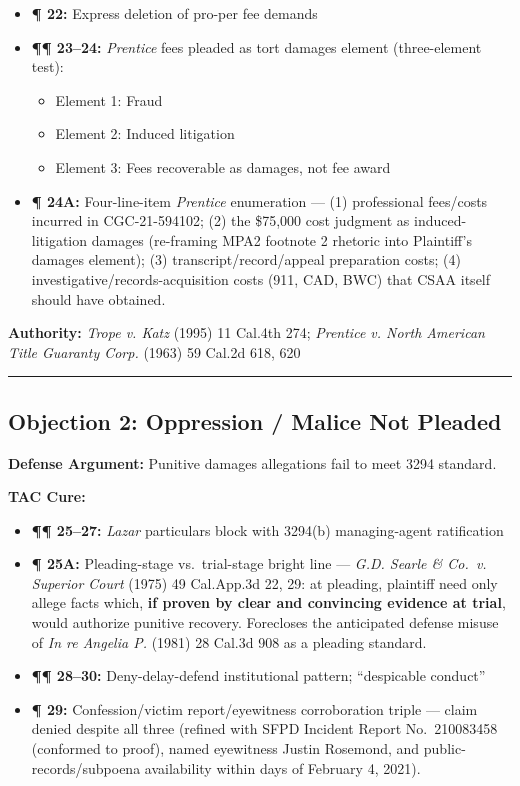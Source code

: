 \begin{itemize}
\tightlist
\item
  \textbf{¶ 22:} Express deletion of pro-per fee demands
\item
  \textbf{¶¶ 23--24:} \emph{Prentice} fees pleaded as tort damages element (three-element test):

  \begin{itemize}
  \tightlist
  \item
    Element 1: Fraud
  \item
    Element 2: Induced litigation
  \item
    Element 3: Fees recoverable as damages, not fee award
  \end{itemize}
\item
  \textbf{¶ 24A:} Four-line-item \emph{Prentice} enumeration --- (1) professional fees/costs incurred in CGC-21-594102; (2) the \$75,000 cost judgment as induced-litigation damages (re-framing MPA2 footnote 2 rhetoric into Plaintiff's damages element); (3) transcript/record/appeal preparation costs; (4) investigative/records-acquisition costs (911, CAD, BWC) that CSAA itself should have obtained.
\end{itemize}

\textbf{Authority:} \emph{Trope v. Katz} (1995) 11 Cal.4th 274; \emph{Prentice v. North American Title Guaranty Corp.} (1963) 59 Cal.2d 618, 620

\begin{center}\rule{0.5\linewidth}{0.5pt}\end{center}

\subsection{Objection 2: Oppression / Malice Not Pleaded}\label{objection-2-oppression-malice-not-pleaded}

\textbf{Defense Argument:} Punitive damages allegations fail to meet \textsection{} 3294 standard.

\textbf{TAC Cure:}

\begin{itemize}
\tightlist
\item
  \textbf{¶¶ 25--27:} \emph{Lazar} particulars block with \textsection{} 3294(b) managing-agent ratification
\item
  \textbf{¶ 25A:} Pleading-stage vs.~trial-stage bright line --- \emph{G.D. Searle \& Co.~v. Superior Court} (1975) 49 Cal.App.3d 22, 29: at pleading, plaintiff need only allege facts which, \textbf{if proven by clear and convincing evidence at trial}, would authorize punitive recovery. Forecloses the anticipated defense misuse of \emph{In re Angelia P.} (1981) 28 Cal.3d 908 as a pleading standard.
\item
  \textbf{¶¶ 28--30:} Deny-delay-defend institutional pattern; ``despicable conduct''
\item
  \textbf{¶ 29:} Confession/victim report/eyewitness corroboration triple --- claim denied despite all three (refined with SFPD Incident Report No.~210083458 (conformed to proof), named eyewitness Justin Rosemond, and public-records/subpoena availability within days of February 4, 2021).
\end{itemize}

